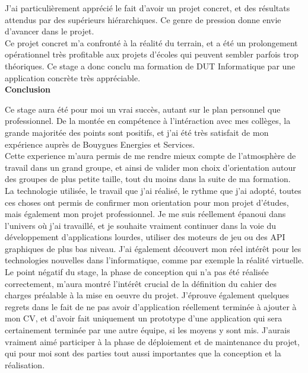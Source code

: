 \documentclass[a4paper]{article}
\begin{document}
    J'ai particulièrement apprécié le fait d'avoir un projet concret, et des résultats attendus par des supérieurs hiérarchiques. Ce genre de pression donne envie d'avancer dans le projet. \\
    
    Ce projet concret m'a confronté à la réalité du terrain, et a été un prolongement opérationnel très profitable aux projets d'écoles qui peuvent sembler parfois trop théoriques. Ce stage a donc conclu ma formation de DUT Informatique par une application concrète très appréciable. \\

    \huge \textbf{Conclusion} \vspace{5pt} \\
   \normalsize
   
    Ce stage aura été pour moi un vrai succès, autant sur le plan personnel que professionnel. De la montée en compétence à l'intéraction avec mes collèges, la grande majoritée des points sont positifs, et j'ai été très satisfait de mon expérience auprès de Bouygues Energies et Services. \\

    Cette experience m'aura permis de me rendre mieux compte de l'atmosphère de travail dans un grand groupe, et ainsi de valider mon choix d'orientation autour des groupes de plus petite taille, tout du moins dans la suite de ma formation. \\

    La technologie utilisée, le travail que j'ai réalisé, le rythme que j'ai adopté, toutes ces choses ont permis de confirmer mon orientation pour mon projet d'études, mais également mon projet professionnel. Je me suis réellement épanoui dans l'univers où j'ai travaillé, et je souhaite vraiment continuer dans la voie du développement d'applications lourdes, utiliser des moteurs de jeu ou des API graphiques de plus bas niveau. J'ai également découvert mon réel intérêt pour les technologies nouvelles dans l'informatique, comme par exemple la réalité virtuelle. \\

    Le point négatif du stage, la phase de conception qui n'a pas été réalisée correctement, m'aura montré l'intérêt crucial de la définition du cahier des charges préalable à la mise en oeuvre du projet. J'éprouve également quelques regrets dans le fait de ne pas avoir d'application réellement terminée à ajouter à mon CV, et d'avoir fait uniquement un prototype d'une application qui sera certainement terminée par une autre équipe, si les moyens y sont mis. J'aurais vraiment aimé participer à la phase de déploiement et de maintenance du projet, qui pour moi sont des parties tout aussi importantes que la conception et la réalisation. \\
\end{document}
